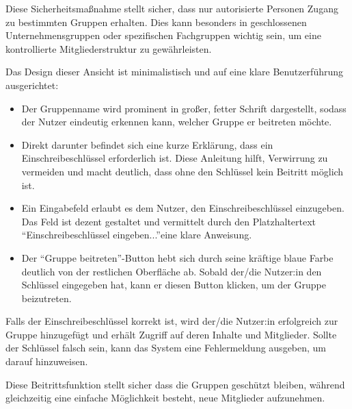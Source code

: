 Diese Sicherheitsmaßnahme stellt sicher, dass nur autorisierte Personen Zugang zu bestimmten Gruppen erhalten. Dies kann besonders in geschlossenen Unternehmensgruppen oder spezifischen Fachgruppen wichtig sein, um eine kontrollierte Mitgliederstruktur zu gewährleisten.

Das Design dieser Ansicht ist minimalistisch und auf eine klare Benutzerführung ausgerichtet:

\begin{itemize}
    \item Der Gruppenname wird prominent in großer, fetter Schrift dargestellt, sodass der Nutzer eindeutig erkennen kann, welcher Gruppe er beitreten möchte.
\end{itemize}

\begin{itemize}
    \item Direkt darunter befindet sich eine kurze Erklärung, dass ein Einschreibeschlüssel erforderlich ist. Diese Anleitung hilft, Verwirrung zu vermeiden und macht deutlich, dass ohne den Schlüssel kein Beitritt möglich ist.
\end{itemize}

\begin{itemize}
    \item Ein Eingabefeld erlaubt es dem Nutzer, den Einschreibeschlüssel einzugeben. Das Feld ist dezent gestaltet und vermittelt durch den Platzhaltertext \textquotedblleft Einschreibeschlüssel eingeben...\textquotedblright \space eine klare Anweisung.
\end{itemize}

\begin{itemize}
    \item Der \textquotedblleft Gruppe beitreten\textquotedblright-Button hebt sich durch seine kräftige blaue Farbe deutlich von der restlichen Oberfläche ab. Sobald der/die Nutzer:in den Schlüssel eingegeben hat, kann er diesen Button klicken, um der Gruppe beizutreten.
\end{itemize}

Falls der Einschreibeschlüssel korrekt ist, wird der/die Nutzer:in erfolgreich zur Gruppe hinzugefügt und erhält Zugriff auf deren Inhalte und Mitglieder. Sollte der Schlüssel falsch sein, kann das System eine Fehlermeldung ausgeben, um darauf hinzuweisen.

Diese Beitrittsfunktion stellt sicher dass die Gruppen geschützt bleiben, während gleichzeitig eine einfache Möglichkeit besteht, neue Mitglieder aufzunehmen.


